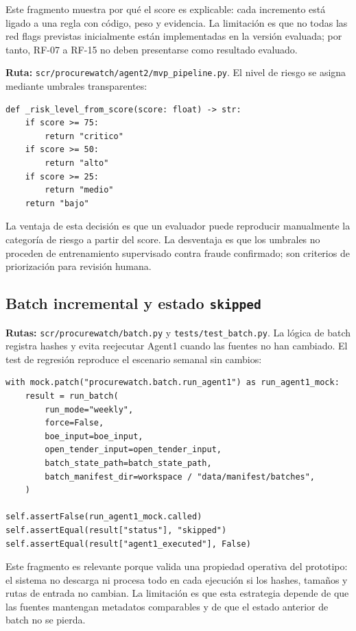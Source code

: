 \documentclass[11pt,a4paper,spanish]{book}
\numberwithin{equation}{chapter}
\numberwithin{figure}{chapter}
\begin{document}
Este fragmento muestra por qu{\'e} el score es explicable: cada incremento est{\'a} ligado a una regla
con c{\'o}digo, peso y evidencia. La limitaci{\'o}n es que no todas las red flags previstas
inicialmente est{\'a}n implementadas en la versi{\'o}n evaluada; por tanto, RF-07 a RF-15 no deben presentarse como
resultado evaluado.

\textbf{Ruta:} \texttt{scr/procurewatch/agent2/mvp\_pipeline.py}. El nivel de riesgo se asigna
mediante umbrales transparentes:

\begin{lstlisting}
def _risk_level_from_score(score: float) -> str:
    if score >= 75:
        return "critico"
    if score >= 50:
        return "alto"
    if score >= 25:
        return "medio"
    return "bajo"
\end{lstlisting}

La ventaja de esta decisi{\'o}n es que un evaluador puede reproducir manualmente la categor{\'i}a de
riesgo a partir del score. La desventaja es que los umbrales no proceden de entrenamiento
supervisado contra fraude confirmado; son criterios de priorizaci{\'o}n para revisi{\'o}n humana.

\subsection{Batch incremental y estado \texttt{skipped}}

\textbf{Rutas:} \texttt{scr/procurewatch/batch.py} y \texttt{tests/test\_batch.py}. La l{\'o}gica de
batch registra hashes y evita reejecutar Agent1 cuando las fuentes no han cambiado. El test de
regresi{\'o}n reproduce el escenario semanal sin cambios:

\begin{lstlisting}
with mock.patch("procurewatch.batch.run_agent1") as run_agent1_mock:
    result = run_batch(
        run_mode="weekly",
        force=False,
        boe_input=boe_input,
        open_tender_input=open_tender_input,
        batch_state_path=batch_state_path,
        batch_manifest_dir=workspace / "data/manifest/batches",
    )

self.assertFalse(run_agent1_mock.called)
self.assertEqual(result["status"], "skipped")
self.assertEqual(result["agent1_executed"], False)
\end{lstlisting}

Este fragmento es relevante porque valida una propiedad operativa del prototipo: el sistema no descarga ni
procesa todo en cada ejecuci{\'o}n si los hashes, tama{\~n}os y rutas de entrada no cambian. La
limitaci{\'o}n es que esta estrategia depende de que las fuentes mantengan metadatos comparables y de
que el estado anterior de batch no se pierda.
\end{document}

